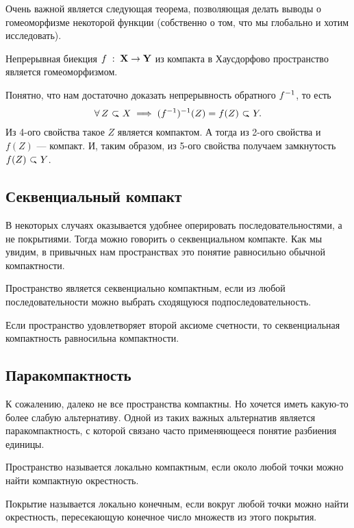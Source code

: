 Очень важной является следующая теорема, позволяющая делать выводы о гомеоморфизме некоторой функции (собственно о том, что мы глобально и хотим исследовать).
\begin{Th}
    Непрерывная биекция $f\; : \; \mathbf{X} \to \mathbf{Y}$ из компакта в Хаусдорфово пространство является гомеоморфизмом.
\end{Th}
\begin{Proof}
    Понятно, что нам достаточно доказать непрерывность обратного $f^{-1}$, то есть 
    \[
        \forall Z \closed X \implies \inv{(\inv{f})} (Z) = f(Z)  \closed Y.
    \] 
    Из 4-ого свойства такое $Z$ является компактом. А тогда из 2-ого свойства и $f(Z)$ --- компакт. И, таким образом, из 5-ого свойства получаем замкнутость $f(Z) \closed Y$.
\end{Proof}

\subsection{Секвенциальный компакт}
В некоторых случаях оказывается удобнее оперировать последовательностями, а не покрытиями. Тогда можно говорить о секвенциальном компакте. Как мы увидим, в привычных нам пространствах это понятие равносильно обычной компактности.
\begin{Def}
    Пространство \topX является секвенциально компактным, если из любой последовательности можно выбрать сходящуюся подпоследовательность.
\end{Def}
\begin{Th}
    Если пространство удовлетворяет второй аксиоме счетности, то секвенциальная компактность равносильна компактности.
\end{Th}

\subsection{Паракомпактность}
К сожалению, далеко не все пространства компактны. Но хочется иметь какую-то более слабую альтернативу. Одной из таких важных альтернатив является паракомпактность, с которой связано часто применяющееся понятие разбиения единицы.
\begin{Def}
    Пространство \topX называется локально компактным, если около любой точки можно найти компактную окрестность.
\end{Def}
\begin{Def}
    Покрытие называется локально конечным, если вокруг любой точки можно найти окрестность, пересекающую конечное число множеств из этого покрытия.
\end{Def}

